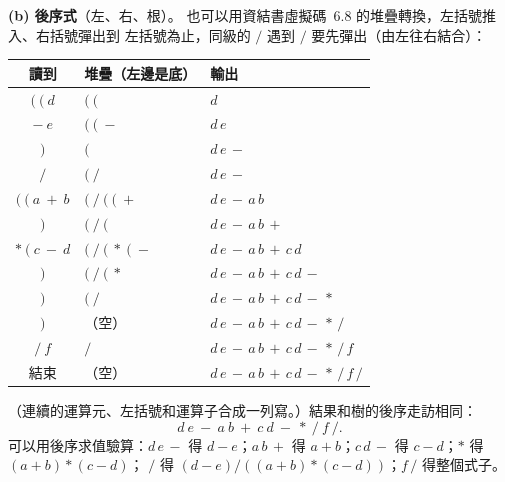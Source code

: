 \begin{pastsoln}
\textbf{(b) 後序式}（左、右、根）。 也可以用資結書虛擬碼~6.8 的堆疊轉換，左括號推入、右括號彈出到
左括號為止，同級的 $/$ 遇到 $/$ 要先彈出（由左往右結合）：
\begin{center}
\small
\begin{tabular}{cll}
\toprule
讀到 & 堆疊（左邊是底） & 輸出 \\
\midrule
$(\ (\ d$ & $(\ ($ & $d$ \\
${-}\ e$ & $(\ (\ {-}$ & $d\,e$ \\
$)$ & $($ & $d\,e\,{-}$ \\
$/$ & $(\ {/}$ & $d\,e\,{-}$ \\
$(\ (\ a\ {+}\ b$ & $(\ {/}\ (\ (\ {+}$ & $d\,e\,{-}\,a\,b$ \\
$)$ & $(\ {/}\ ($ & $d\,e\,{-}\,a\,b\,{+}$ \\
${*}\ (\ c\ {-}\ d$ & $(\ {/}\ (\ {*}\ (\ {-}$ & $d\,e\,{-}\,a\,b\,{+}\,c\,d$ \\
$)$ & $(\ {/}\ (\ {*}$ & $d\,e\,{-}\,a\,b\,{+}\,c\,d\,{-}$ \\
$)$ & $(\ {/}$ & $d\,e\,{-}\,a\,b\,{+}\,c\,d\,{-}\,{*}$ \\
$)$ & （空） & $d\,e\,{-}\,a\,b\,{+}\,c\,d\,{-}\,{*}\,{/}$ \\
${/}\ f$ & $/$ & $d\,e\,{-}\,a\,b\,{+}\,c\,d\,{-}\,{*}\,{/}\,f$ \\
結束 & （空） & $d\,e\,{-}\,a\,b\,{+}\,c\,d\,{-}\,{*}\,{/}\,f\,{/}$ \\
\bottomrule
\end{tabular}
\end{center}
（連續的運算元、左括號和運算子合成一列寫。）結果和樹的後序走訪相同：
\[
d\ e\ {-}\ a\ b\ {+}\ c\ d\ {-}\ {*}\ {/}\ f\ {/}.
\]
可以用後序求值驗算：$d\,e\,{-}$ 得 $d-e$；$a\,b\,{+}$ 得 $a+b$；$c\,d\,{-}$ 得 $c-d$；$*$ 得 $(a+b)*(c-d)$；
$/$ 得 $(d-e)/((a+b)*(c-d))$；$f\,{/}$ 得整個式子。
\end{pastsoln}
